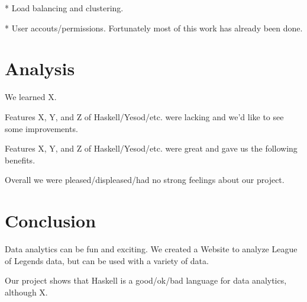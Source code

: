 \documentclass{chi2009}
\begin{document}
* Load balancing and clustering.

* User accouts/permissions.  Fortunately most of this work has already been done.

\section{Analysis}
\label{analysis}

We learned X.

Features X, Y, and Z of Haskell/Yesod/etc. were lacking and we'd like to see some improvements.

Features X, Y, and Z of Haskell/Yesod/etc. were great and gave us the following benefits.

Overall we were pleased/displeased/had no strong feelings about our project.

\section{Conclusion}
\label{conclusion}

Data analytics can be fun and exciting. We created a Website to analyze League of Legends data, but can be used with a variety of data.

Our project shows that Haskell is a good/ok/bad language for data analytics, although X. 



\end{document}
